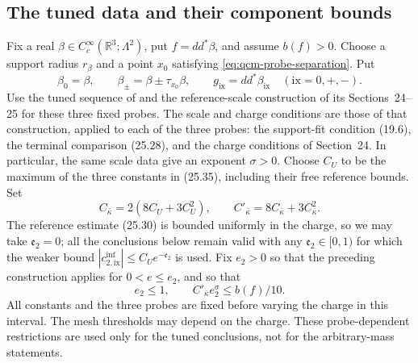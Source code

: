 \documentclass[11pt,letterpaper,reqno]{amsart}
\theoremstyle{definition}
\begin{document}
\subsection{The tuned data and their component bounds}
\label{qcm:tuned-input-package}
\label{qcm:rg-inputs}

Fix a real $\beta\in C_c^\infty(\mathbb R^3;\Lambda^2)$, put
$f=dd^*\beta$, and assume $b(f)>0$.
Choose a support radius $r_\beta$ and a point $x_0$ satisfying
\eqref{eq:qcm-probe-separation}. Put
\[
 \beta_0=\beta,\qquad
 \beta_\pm=\beta\pm\tau_{x_0}\beta,\qquad
 g_{\mathrm{ix}}=dd^*\beta_{\mathrm{ix}}
       \quad(\mathrm{ix}=0,+,-).
\]
Use the tuned sequence of
\cite[Theorems~16.3--16.4]{QEDConstruction} and the reference-scale
construction of its Sections~24--25 for these three fixed probes.
The scale and charge conditions are those of that construction,
applied to each of the three probes: the support-fit condition
(19.6), the terminal comparison (25.28), and the charge conditions
of Section~24.
In particular, the same scale data give an exponent $\sigma>0$.
Choose $C_U$ to be the maximum of the three constants in (25.35),
including their free reference bounds. Set
\[
 C_{\bar\kappa}=2(8C_U+3C_U^2),\qquad
 C'_{\bar\kappa}=8C_{\bar\kappa}+3C_{\bar\kappa}^2.
\]
The reference estimate (25.30) is bounded uniformly in the charge,
so we may take $\mathfrak e_2=0$; all the conclusions below remain
valid with any $\mathfrak e_2\in[0,1)$ for which the weaker bound
$|c^{\mathrm{inf}}_{2,\mathrm{ix}}|\le C_Ue^{-\mathfrak e_2}$ is used.
Fix $e_2>0$ so that the preceding construction applies for
$0<e\le e_2$, and so that
\[
 e_2\le1,\qquad C'_{\bar\kappa}e_2^\sigma\le b(f)/10.
\]
All constants and the three probes are fixed before varying the
charge in this interval. The mesh thresholds may depend on the
charge. These probe-dependent restrictions are used only for the
tuned conclusions, not for the arbitrary-mass statements.
\end{document}
